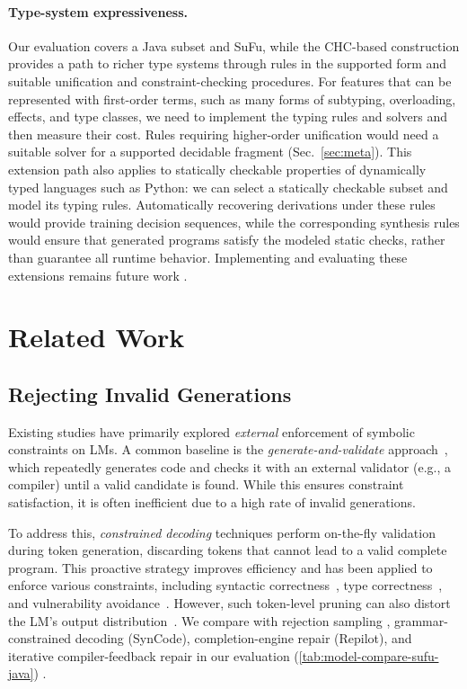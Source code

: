 \documentclass[manuscript,screen]{acmart}
\begin{document}
\paragraph{{\color{revblue}Type-system expressiveness.}}
{\color{revblue}Our evaluation covers a Java subset and SuFu, while the CHC-based construction provides a path to richer type systems through rules in the supported form and suitable unification and constraint-checking procedures. For features that can be represented with first-order terms, such as many forms of subtyping, overloading, effects, and type classes, we need to implement the typing rules and solvers and then measure their cost. Rules requiring higher-order unification would need a suitable solver for a supported decidable fragment (Sec.~\ref{sec:meta}). This extension path also applies to statically checkable properties of dynamically typed languages such as Python: we can select a statically checkable subset and model its typing rules. Automatically recovering derivations under these rules would provide training decision sequences, while the corresponding synthesis rules would ensure that generated programs satisfy the modeled static checks, rather than guarantee all runtime behavior. Implementing and evaluating these extensions remains future work} .

 

 \section{Related Work}\label{sec:related}

\subsection{Rejecting Invalid Generations}
Existing studies have primarily explored \emph{external} enforcement of symbolic constraints    {\color{revblue}on } LMs.
%
A common baseline is the \emph{generate-and-validate} approach~\cite{DBLP:conf/sigsoft/ZhuSXZY0Z21,DBLP:conf/popl/LongR16}, which repeatedly generates code and checks it with an external validator (e.g., a compiler) until a valid candidate is found. While this ensures constraint satisfaction, it is often inefficient due to a high rate of invalid generations.

To address this, \emph{constrained decoding} techniques perform on-the-fly validation during token generation, discarding tokens that cannot lead to a valid complete program. This proactive strategy improves efficiency and has been applied to enforce various constraints, including syntactic correctness~\cite{ugare2024syncodellmgenerationgrammar}, type correctness~\cite{DBLP:journals/corr/abs-2504-09246}, and vulnerability avoidance~\cite{DBLP:conf/issre/StorhaugLH23}. However, such token-level pruning can also distort the LM's output distribution~\cite{DBLP:conf/nips/ParkWBPD24}. We compare with rejection sampling {\color{revblue}, grammar-constrained decoding (SynCode), completion-engine repair (Repilot), and iterative compiler-feedback repair } in our evaluation (\autoref{tab:model-compare-sufu-java})  .
\end{document}
